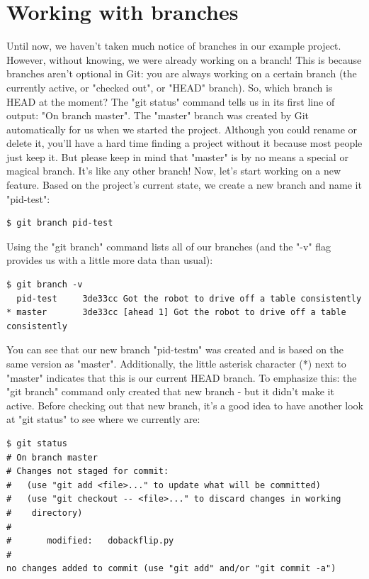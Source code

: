 \documentclass{article}
\begin{document}
\section{Working with branches}
Until now, we haven't taken much notice of branches in our example project. However, without knowing, we were already working on a branch! This is because branches aren't optional in Git: you are always working on a certain branch (the currently active, or "checked out", or "HEAD" branch).
\newline\newline
So, which branch is HEAD at the moment? The "git status" command tells us in its first line of output: "On branch master".
The "master" branch was created by Git automatically for us when we started the project. Although you could rename or delete it, you'll have a hard time finding a project without it because most people just keep it. But please keep in mind that "master" is by no means a special or magical branch. It's like any other branch!
\newline\newline
Now, let's start working on a new feature. Based on the project's current state, we create a new branch and name it "pid-test":
\begin{lstlisting}
$ git branch pid-test
\end{lstlisting}
Using the "git branch" command lists all of our branches (and the "-v" flag provides us with a little more data than usual):
\begin{lstlisting}
$ git branch -v
  pid-test     3de33cc Got the robot to drive off a table consistently
* master       3de33cc [ahead 1] Got the robot to drive off a table consistently
\end{lstlisting}
You can see that our new branch "pid-testm" was created and is based on the same version as "master". Additionally, the little asterisk character (*) next to "master" indicates that this is our current HEAD branch. To emphasize this: the "git branch" command only created that new branch - but it didn't make it active. Before checking out that new branch, it's a good idea to have another look at "git status" to see where we currently are:
\begin{lstlisting}
$ git status
# On branch master
# Changes not staged for commit:
#   (use "git add <file>..." to update what will be committed)
#   (use "git checkout -- <file>..." to discard changes in working 
#    directory)
#
#       modified:   dobackflip.py
#
no changes added to commit (use "git add" and/or "git commit -a")
\end{lstlisting}
\end{document}
